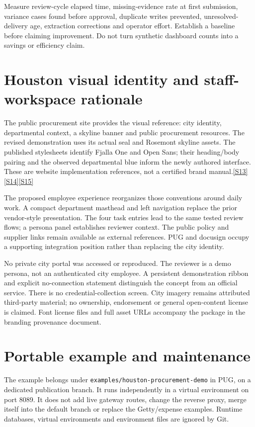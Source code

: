 \documentclass[11pt,letterpaper]{article}
\newcommand{\src}[1]{\hyperref[src:#1]{[#1]}}
\newcommand{\code}[1]{\texttt{\small #1}}
\begin{document}
Measure review-cycle elapsed time, missing-evidence rate at first submission, variance cases found before approval, duplicate writes prevented, unresolved-delivery age, extraction corrections and operator effort. Establish a baseline before claiming improvement. Do not turn synthetic dashboard counts into a savings or efficiency claim.

\section{Houston visual identity and staff-workspace rationale}
The public procurement site provides the visual reference: city identity, departmental context, a skyline banner and public procurement resources. The revised demonstration uses its actual seal and Rosemont skyline assets. The published stylesheets identify Fjalla One and Open Sans; their heading/body pairing and the observed departmental blue inform the newly authored interface. These are website implementation references, not a certified brand manual.\src{S13}\src{S14}\src{S15}

The proposed employee experience reorganizes those conventions around daily work. A compact department masthead and left navigation replace the prior vendor-style presentation. The four task entries lead to the same tested review flows; a persona panel establishes reviewer context. The public policy and supplier links remain available as external references. PUG and docusign occupy a supporting integration position rather than replacing the city identity.

No private city portal was accessed or reproduced. The reviewer is a demo persona, not an authenticated city employee. A persistent demonstration ribbon and explicit no-connection statement distinguish the concept from an official service. There is no credential-collection screen. City imagery remains attributed third-party material; no ownership, endorsement or general open-content license is claimed. Font license files and full asset URLs accompany the package in the branding provenance document.

\section{Portable example and maintenance}
The example belongs under \code{examples/houston-procurement-demo} in PUG, on a dedicated publication branch. It runs independently in a virtual environment on port 8089. It does not add live gateway routes, change the reverse proxy, merge itself into the default branch or replace the Getty/expense examples. Runtime databases, virtual environments and environment files are ignored by Git.
\end{document}
